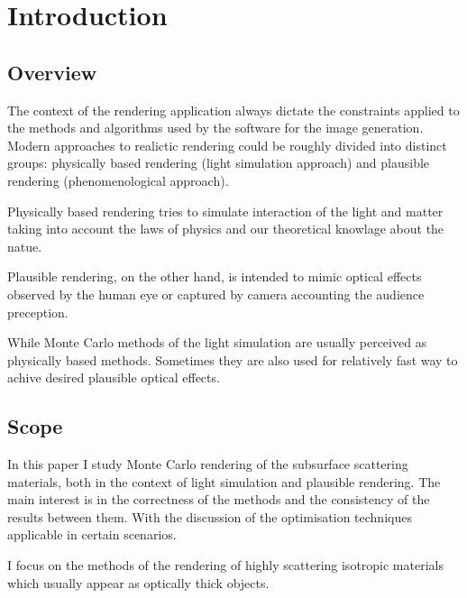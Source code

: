 \chapter{Introduction}
\label{chapter:introduction}

\section{Overview}

The context of the rendering application always dictate the constraints
applied to the methods and algorithms used by the software for the image generation.
Modern approaches to realictic rendering could be roughly divided into distinct
groups:
physically based rendering (light simulation approach) and plausible rendering
(phenomenological approach).

Physically based rendering tries to simulate interaction of the light and matter
taking into account the laws of physics and our theoretical knowlage about the
natue.

Plausible rendering, on the other hand, is intended to mimic optical effects
observed by the human eye or captured by camera accounting the audience
preception.

While Monte Carlo methods of the light simulation are usually perceived as
physically based methods. Sometimes they are also used for relatively fast way
to achive desired plausible optical effects.

\section{Scope}
In this paper I study Monte Carlo rendering of the subsurface scattering
materials, both in the context of light simulation and plausible rendering.
The main interest is in the correctness of the methods and the
consistency of the results between them. With the discussion of the optimisation
techniques applicable in certain scenarios.

I focus on the methods of the rendering of highly scattering isotropic materials
which usually appear as optically thick objects.

